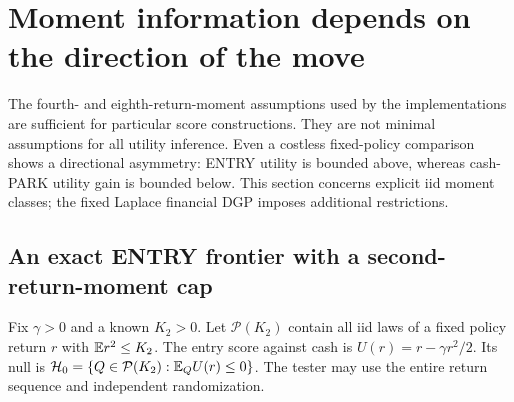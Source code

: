 \section{Moment information depends on the direction of the move}
\label{sec:directional-information}
The fourth- and eighth-return-moment assumptions used by the implementations
are sufficient for particular score constructions. They are not minimal
assumptions for all utility inference. Even a costless fixed-policy comparison shows a directional
asymmetry: ENTRY utility is bounded above, whereas cash-PARK utility gain is
bounded below. This section concerns explicit iid moment classes; the fixed
Laplace financial DGP imposes additional restrictions.

\subsection{An exact ENTRY frontier with a second-return-moment cap}
Fix $\gamma>0$ and a known $K_2>0$. Let $\mathcal P(K_2)$ contain all iid laws
of a fixed policy return $r$ with $\mathbb E r^2\le K_2$. The entry score against
cash is $U(r)=r-\gamma r^2/2$. Its null is
$\mathcal H_0=\{Q\in\mathcal P(K_2):\mathbb E_Q U(r)\le0\}$.
The tester may use the entire return sequence and independent randomization.

